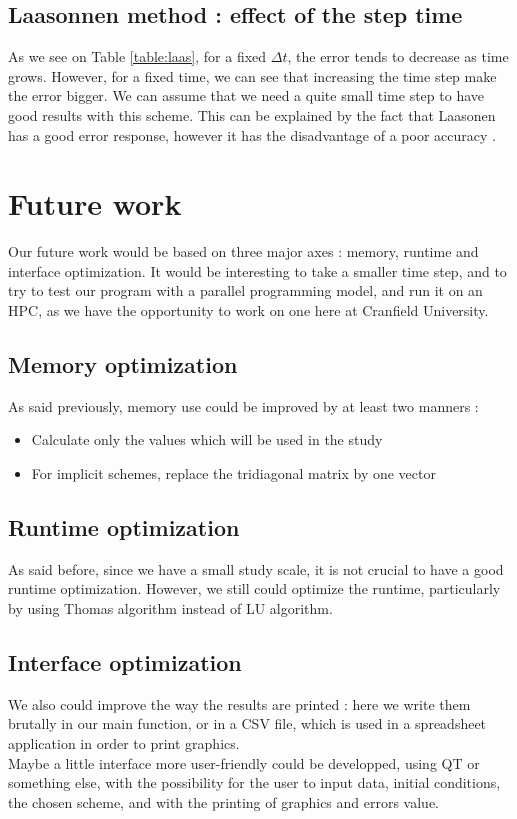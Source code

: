 \documentclass{article}
\begin{document}
            \subsection{Laasonnen method : effect of the step time}
                As we see on Table \ref{table:laas}, for a fixed $\Delta t$, the error tends to decrease as time grows. However,
                for a fixed time, we can see that increasing the time step make the error bigger. We can assume that we need a
                quite small time step to have good results with this scheme. This can be explained by the fact that
                Laasonen has a good error response, however it has the disadvantage of a poor accuracy \cite{laas}.
        \newpage
        \section{Future work}
            Our future work would be based on three major axes : memory, runtime and interface optimization.
            It would be interesting to take a smaller time step, and to try to test our program
            with a parallel programming model, and run it on an HPC, as we have the opportunity 
            to work on one here at Cranfield University.
            \subsection{Memory optimization}
                As said previously, memory use could be improved by at least two manners :
                \begin{itemize}
                    \item{Calculate only the values which will be used in the study}
                    \item{For implicit schemes, replace the tridiagonal matrix by one vector}
                \end{itemize}
            \subsection{Runtime optimization}
                As said before, since we have a small study scale, it is not crucial to have a good
                runtime optimization. However, we still could optimize the runtime, particularly
                by using Thomas algorithm instead of LU algorithm.
            \subsection{Interface optimization}
                We also could improve the way the results are printed : here we write them brutally
                in our main function, or in a CSV file, which is used in a spreadsheet application
                in order to print graphics.
                \\
                Maybe a little interface more user-friendly could be developped, using QT or something
                else, with the possibility for the user to input data, initial conditions, the chosen
                scheme, and with the printing of graphics and errors value.
    
\end{document}

